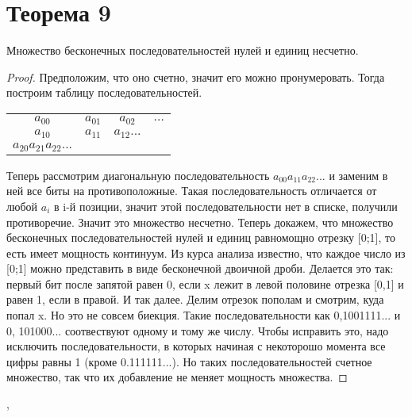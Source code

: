 \documentclass[a4paper,12pt]{article}
\begin{document}
	\section{Теорема 9}
	\begin{theorem}
		Множество бесконечных последовательностей нулей и единиц несчетно. 
	\end{theorem}

	\begin{proof}
		Предположим, что оно счетно, значит его можно пронумеровать. Тогда построим таблицу
		последовательностей.
		\begin{center}
			\begin{tabular}{cccc}
				$a_{00}$ & $a_{01}$ & $a_{02}$ & $\ldots$ \\
				$a_{10}$ & $a_{11}$ & $a_{12} ...$ \\
				$a_{20} a_{21} a_{22} ...$ \\
			\end{tabular}
		\end{center}
		
		
		Теперь рассмотрим диагональную последовательность  $a_{00} a_{11} a_{22} ...$ и
		заменим в ней все биты на противоположные. Такая последовательность отличается
		от любой $a_{i}$ в i-й позиции, значит этой последовательности нет в списке,
		получили противоречие. Значит это множество несчетно.
		Теперь докажем, что множество бесконечных последовательностей нулей и единиц равномощно
		отрезку [0;1], то есть имеет мощность континуум.
		Из курса анализа известно, что каждое число из [0;1] можно представить в виде
		бесконечной двоичной дроби. Делается это так: первый бит после запятой равен 0, если
		x лежит в левой половине отрезка [0,1] и равен 1, если в правой. И так далее. Делим
		отрезок пополам и смотрим, куда попал x. Но это не совсем биекция. Такие последовательности
		как 0,1001111... и 0, 101000... соотвествуют одному и тому же числу. Чтобы исправить
		это, надо исключить последовательности, в которых начиная с некоторошо момента все
		цифры равны 1 (кроме 0.111111...). Но таких последовательностей счетное множество, так
		что их добавление не меняет мощность множества.
	\end{proof}

	
	\sep	
\end{document}
